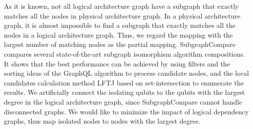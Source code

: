 \documentclass[runningheads]{llncs}
\begin{document}
As it is known, not all logical architecture graph have a subgraph that exactly matches all the nodes in physical architecture graph.
In a physical architecture graph, it is almost impossible to find a subgraph that exactly matches all the nodes in a logical architecture graph. Thus, we regard the mapping with the largest number of matching nodes as the partial mapping. SubgraphCompare compares several state-of-the-art subgraph isomorphism algorithm compositions. 
It shows that the best performance can be achieved by using filters and the sorting ideas of the GraphQL algorithm to process candidate nodes, and the local candidates calculation method LFTJ based on set-intersection to enumerate the results. We artificially connect the isolating qubits to the qubits with the largest degree in the logical architecture graph, since SubgraphCompare cannot handle disconnected graphs. We would like to minimize the impact of logical dependency graphs, thus map isolated nodes to nodes with the largest degree.
\end{document}
